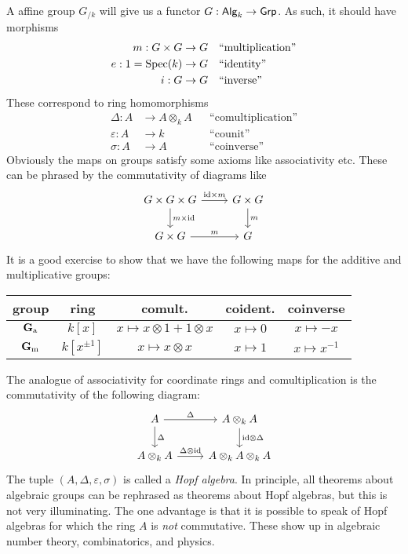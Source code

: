 A affine group $G_{/k}$ will give us a functor $G:\mathsf{Alg}_{k}\to \mathsf{Grp}$. As 
such, it should have morphisms 
\begin{align*}
  m :G\times G &\to G && \text{``multiplication''} \\
  e:1=\operatorname{Spec}(k) &\to G && \text{``identity''} \\
  i:G &\to G && \text{``inverse''}
\end{align*}
These correspond to ring homomorphisms 
\begin{align*}
  \Delta:A &\to A\otimes_k A && \text{``comultiplication''} \\
  \varepsilon : A &\to k && \text{``counit''} \\
  \sigma:A &\to A && \text{``coinverse''}
\end{align*}
Obviously the maps on groups satisfy some axioms like associativity etc. These 
can be phrased by the commutativity of diagrams like 
\[\begin{tikzcd}
  G\times G\times G \ar[r, "\id\times m"] \ar[d, "m\times \id"] 
    & G\times G \ar[d, "m"] \\ 
  G\times G \ar[r, "m"] 
    & G 
\end{tikzcd}\]
It is a good exercise to show that we have the following maps for the additive 
and multiplicative groups:
\begin{center}
\begin{tabular}{c|cccc}
group & ring & comult. & coident. & coinverse \\ \hline
$\mathbf{G}_\mathrm{a}$ & $k[x]$ & $x\mapsto x\otimes 1+1\otimes x$ & $x\mapsto 0$ & $x\mapsto -x$ \\
$\mathbf{G}_\mathrm{m}$ & $k[x^{\pm 1}]$ & $x\mapsto x\otimes x$ & $x\mapsto 1$ & $x\mapsto x^{-1}$
\end{tabular}
\end{center}
The analogue of associativity for coordinate rings and comultiplication is the 
commutativity of the following diagram:
\[\begin{tikzcd}
  A \ar[r, "\Delta"] \ar[d, "\Delta"] 
    & A\otimes_k A \ar[d, "\id\otimes \Delta"] \\
  A\otimes_k A \ar[r, "\Delta\otimes \id"] 
    & A\otimes_k A\otimes_k A
\end{tikzcd}\]
The tuple $(A,\Delta,\varepsilon,\sigma)$ is called a \emph{Hopf algebra}. In 
principle, all theorems about algebraic groups can be rephrased as theorems 
about Hopf algebras, but this is not very illuminating. The one advantage is 
that it is possible to speak of Hopf algebras for which the ring $A$ is 
\emph{not} commutative. These show up in algebraic number theory, combinatorics, 
and physics. 

